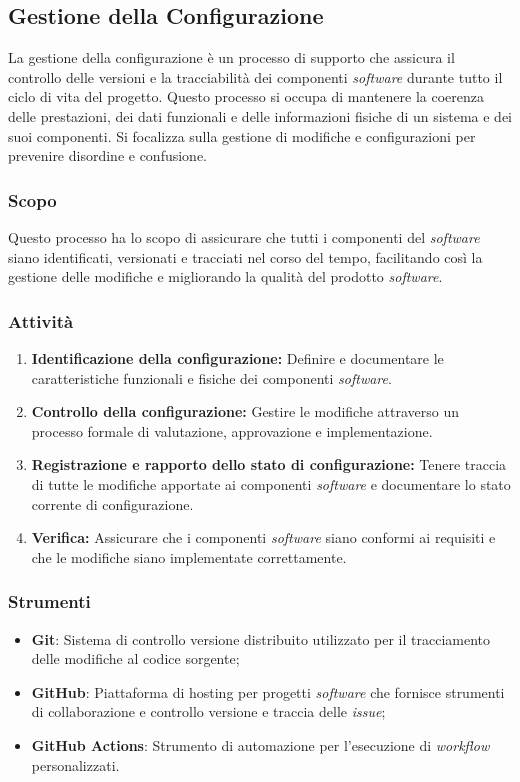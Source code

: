 \subsection{Gestione della Configurazione}

La gestione della configurazione è un processo di supporto che assicura il
controllo delle versioni e la tracciabilità dei componenti \textit{software}
durante tutto il ciclo di vita del progetto.
Questo processo si occupa di mantenere la coerenza delle prestazioni, dei dati
funzionali e delle informazioni fisiche di un sistema e dei suoi componenti.
Si focalizza sulla gestione di modifiche e configurazioni per prevenire
disordine e confusione.

\subsubsection{Scopo}
Questo processo ha lo scopo di assicurare che tutti i componenti del
\textit{software} siano identificati, versionati e tracciati nel corso del
tempo, facilitando così la gestione delle modifiche e migliorando la qualità
del prodotto \textit{software}.

\subsubsection{Attività}
\begin{enumerate}
	\item \textbf{Identificazione della configurazione:} Definire e documentare
	      le caratteristiche funzionali e fisiche dei componenti
	      \textit{software}.
	\item \textbf{Controllo della configurazione:} Gestire le modifiche
	      attraverso un processo formale di valutazione, approvazione e
	      implementazione.
	\item \textbf{Registrazione e rapporto dello stato di configurazione:}
	      Tenere traccia di tutte le modifiche apportate ai componenti
	      \textit{software} e documentare lo stato corrente di configurazione.
	\item \textbf{Verifica:} Assicurare che i componenti \textit{software} siano
	      conformi ai requisiti e che le modifiche siano implementate
	      correttamente.
\end{enumerate}

\subsubsection{Strumenti}
\begin{itemize}
	\item \textbf{Git}: Sistema di controllo versione distribuito utilizzato per
	      il tracciamento delle modifiche al codice sorgente;
	\item \textbf{GitHub\g}: Piattaforma di hosting per progetti \textit{software}
	      che fornisce strumenti di collaborazione e controllo versione e
	      traccia delle \textit{issue\g};
	\item \textbf{GitHub Actions}: Strumento di automazione per l'esecuzione di
	      \textit{workflow} personalizzati.
\end{itemize}
